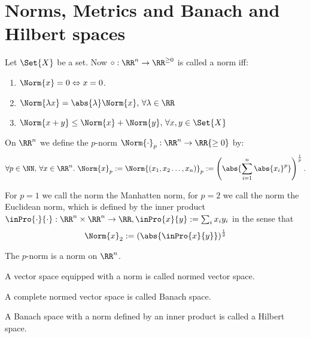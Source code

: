 \section{Norms, Metrics and Banach and Hilbert spaces}
\begin{defn}
 Let $\Set{X}$ be a set. Now $\circ:\RR^n\to\RR^{\geq 0}$ is called a norm iff:
 \begin{enumerate}
  \item $\Norm{x}=0\Leftrightarrow x=0$.
  \item $\Norm{\lambda x}=\abs{\lambda}\Norm{x}, \,\forall \lambda\in\RR$
  \item $\Norm{x+y}\leq\Norm{x}+\Norm{y}, \,\forall x,y\in\Set{X}$
 \end{enumerate}
\end{defn}
\begin{defn}
 On $\RR^n$ we define the $p$-norm $\Norm{\cdot}_p:\RR^n\to\RR{\geq 0}$ by:
 $$\forall p\in\NN,\, \forall x\in\RR^n.\ \Norm{x}_p:=\Norm{(x_1, x_2\ldots, x_n)}_p:=\left(\abs{\sum_{i=1}^{n}\abs{x_i}^p}\right)^{\frac{1}{p}}.$$
\end{defn}
For $p=1$ we call the norm the Manhatten norm, for $p=2$ we call the norm the Euclidean norm, which is defined by the inner product $\inPro{\cdot}{\cdot}:\RR^n\times \RR^n\to\RR, \inPro{x}{y}:=\sum_{i}x_iy_i$ in the sense that $$\Norm{x}_2:=\left(\abs{\inPro{x}{y}}\right)^\frac{1}{2}$$
\begin{exc}
 The $p$-norm is a norm on $\RR^n$. 
\end{exc}
\begin{defn}
 A vector space equipped with a norm is called normed vector space.
\end{defn}
\begin{defn}
 A complete normed vector space is called Banach space.
\end{defn}
\begin{defn}
 A Banach space with a norm defined by an inner product is called a Hilbert space. 
\end{defn}

